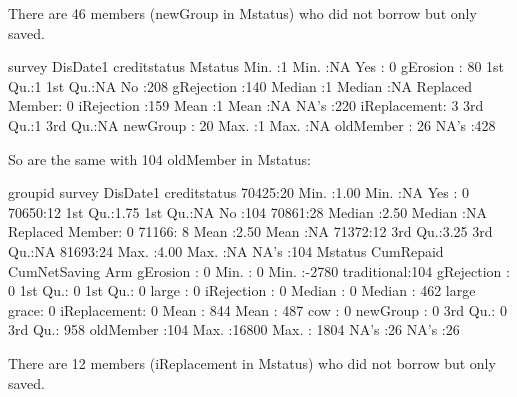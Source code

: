 There are 46 members (\textsf{newGroup} in \textsf{Mstatus}) who did not borrow but only saved. 
\begin{Schunk}
\begin{Soutput}
     survey     DisDate1            creditstatus         Mstatus   
 Min.   :1   Min.   :NA    Yes            :  0   gErosion    : 80  
 1st Qu.:1   1st Qu.:NA    No             :208   gRejection  :140  
 Median :1   Median :NA    Replaced Member:  0   iRejection  :159  
 Mean   :1   Mean   :NA    NA's           :220   iReplacement:  3  
 3rd Qu.:1   3rd Qu.:NA                          newGroup    : 20  
 Max.   :1   Max.   :NA                          oldMember   : 26  
             NA's   :428                                           
\end{Soutput}
\end{Schunk}
So are the same with 104 \textsf{oldMember} in \textsf{Mstatus}:
\begin{Schunk}
\begin{Soutput}
  groupid       survey        DisDate1            creditstatus
 70425:20   Min.   :1.00   Min.   :NA    Yes            :  0  
 70650:12   1st Qu.:1.75   1st Qu.:NA    No             :104  
 70861:28   Median :2.50   Median :NA    Replaced Member:  0  
 71166: 8   Mean   :2.50   Mean   :NA                         
 71372:12   3rd Qu.:3.25   3rd Qu.:NA                         
 81693:24   Max.   :4.00   Max.   :NA                         
                           NA's   :104                        
         Mstatus      CumRepaid      CumNetSaving            Arm     
 gErosion    :  0   Min.   :    0   Min.   :-2780   traditional:104  
 gRejection  :  0   1st Qu.:    0   1st Qu.:    0   large      :  0  
 iRejection  :  0   Median :    0   Median :  462   large grace:  0  
 iReplacement:  0   Mean   :  844   Mean   :  487   cow        :  0  
 newGroup    :  0   3rd Qu.:    0   3rd Qu.:  958                    
 oldMember   :104   Max.   :16800   Max.   : 1804                    
                    NA's   :26      NA's   :26                       
\end{Soutput}
\end{Schunk}
There are 12 members (\textsf{iReplacement} in \textsf{Mstatus}) who did not borrow but only saved. 
